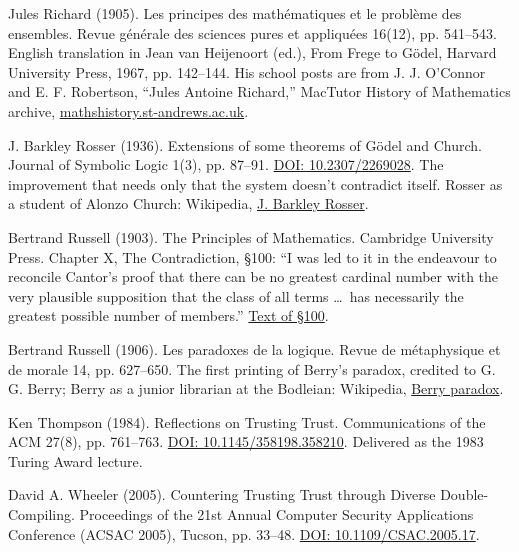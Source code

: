 \documentclass[11pt,twoside]{article}
\theoremstyle{thielethm}
\theoremstyle{thieledef}
\theoremstyle{thieledef}
\theoremstyle{thieledef}
\theoremstyle{thielethm}
\theoremstyle{thieleobs}
\theoremstyle{thielethm}
\begin{document}
\noindent Jules Richard (1905). Les principes des math\'ematiques et le probl\`eme des ensembles. Revue g\'en\'erale des sciences pures et appliqu\'ees 16(12), pp. 541--543. English translation in Jean van Heijenoort (ed.), From Frege to G\"odel, Harvard University Press, 1967, pp. 142--144. His school posts are from J. J. O'Connor and E. F. Robertson, ``Jules Antoine Richard,'' MacTutor History of Mathematics archive, \href{https://mathshistory.st-andrews.ac.uk/Biographies/Richard_Jules/}{mathshistory.st-andrews.ac.uk}.
\par\medskip

\noindent J. Barkley Rosser (1936). Extensions of some theorems of G\"odel and Church. Journal of Symbolic Logic 1(3), pp. 87--91. \href{https://doi.org/10.2307/2269028}{DOI: 10.2307/2269028}. The improvement that needs only that the system doesn't contradict itself. Rosser as a student of Alonzo Church: Wikipedia, \href{https://en.wikipedia.org/wiki/J._Barkley_Rosser}{J. Barkley Rosser}.
\par\medskip

\noindent Bertrand Russell (1903). The Principles of Mathematics. Cambridge University Press. Chapter X, The Contradiction, \S100: ``I was led to it in the endeavour to reconcile Cantor's proof that there can be no greatest cardinal number with the very plausible supposition that the class of all terms \ldots\ has necessarily the greatest possible number of members.'' \href{https://fair-use.org/bertrand-russell/the-principles-of-mathematics/s100}{Text of \S100}.
\par\medskip

\noindent Bertrand Russell (1906). Les paradoxes de la logique. Revue de m\'etaphysique et de morale 14, pp. 627--650. The first printing of Berry's paradox, credited to G. G. Berry; Berry as a junior librarian at the Bodleian: Wikipedia, \href{https://en.wikipedia.org/wiki/Berry_paradox}{Berry paradox}.
\par\medskip

\noindent Ken Thompson (1984). Reflections on Trusting Trust. Communications of the ACM 27(8), pp. 761--763. \href{https://doi.org/10.1145/358198.358210}{DOI: 10.1145/358198.358210}. Delivered as the 1983 Turing Award lecture.
\par\medskip

\noindent David A. Wheeler (2005). Countering Trusting Trust through Diverse Double-Compiling. Proceedings of the 21st Annual Computer Security Applications Conference (ACSAC 2005), Tucson, pp. 33--48. \href{https://doi.org/10.1109/CSAC.2005.17}{DOI: 10.1109/CSAC.2005.17}.
\par\medskip
\end{document}
